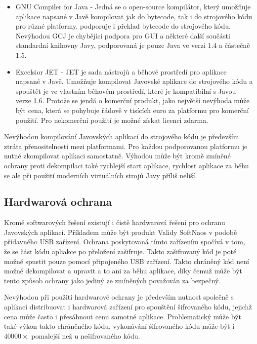 \begin{itemize}
  \item GNU Compiler for Java\cite{gcj} - Jedná se o open-source kompilátor,
  který umožňuje aplikace napsané v Javě kompilovat jak do bytecode, tak i do
  strojového kódu pro různé platformy, podporuje i překlad bytecode do
  strojového kódu. Nevýhodou GCJ je chybějící podpora pro \gls{GUI} a některé
  další součásti standardní knihovny Javy, podporovaná je pouze Java ve
  verzi 1.4 a částečně 1.5.
  \item Excelsior JET\cite{jet} - JET je sada nástrojů a běhové prostředí pro
  aplikace napsané v Javě. Umožňuje kompilovat Javovské aplikace do strojového
  kódu a spouštět je ve vlastním běhovém prostředí, které je kompatibilní s
  Javou verze 1.6. Protože se jendá o komerční produkt, jako největší nevýhoda
  může být cena, která se pohybuje řádově v tisících euro za platformu pro
  komerční použití. Pro nekomerční použití je možné získat licenci zdarma.
\end{itemize}

Nevýhodou kompilování Javovských aplikací do strojového kódu je především ztráta
přenositelnosti mezi platformami. Pro každou podporovanou platformu je nutné
zkompilovat aplikaci samostatně. Výhodou může být kromě zmíněné ochrany proti
dekompilaci také rychlejší start aplikace, rychlost aplikace za běhu se ale při
použití moderních virtuálních strojů Javy příliš neliší.


\subsection{Hardwarová ochrana}

Kromě softwarových řešení existují i čistě hardwarová řešení pro ochranu
Javovských aplikací. Příkladem může být produkt Validy
SoftNaos\cite{validy-softnaos} v podobě přídavného USB zařízení. Ochrana
poskytovaná tímto zařízením spočívá v tom, že se část kódu apliakce po přeložení
zašifruje. Takto zašifrovaný kód je poté možné spustit pouze pomocí připojeného
USB zařízení. Takto chráněný kód není možné dekompilovat a upravit a to ani za
běhu aplikace, díky čemuž může být tento způsob ochrany jako jediný ze zmíněných
považován za bezpečný.

Nevýhodou při použití hardwarové ochrany je především nutnost společně s
aplikací distribuovat i hardwarová zařízení pro spouštění šifrovaného kódu,
jejichž cena může často i přesáhnout cenu samotné aplikace. Problematický může
být také výkon takto chráněného kódu, vykonávání šifrovaného kódu může být i
$40000\times$ pomalejší než u nešifrovaného kódu\cite{validy-softnaos-review}.

